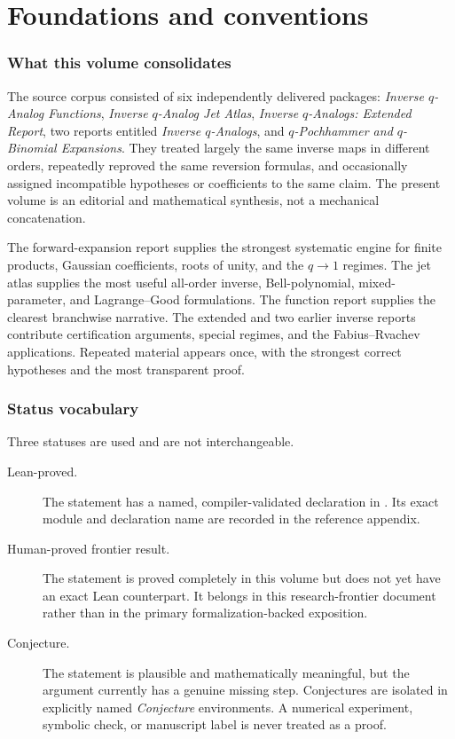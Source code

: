 \part{Foundations and conventions}

\section{What this volume consolidates}
\label{sec:scope}

The source corpus consisted of six independently delivered packages:
\emph{Inverse \(q\)-Analog Functions},
\emph{Inverse \(q\)-Analog Jet Atlas},
\emph{Inverse \(q\)-Analogs: Extended Report},
two reports entitled \emph{Inverse \(q\)-Analogs}, and
\emph{\(q\)-Pochhammer and \(q\)-Binomial Expansions}.  They treated largely
the same inverse maps in different orders, repeatedly reproved the same
reversion formulas, and occasionally assigned incompatible hypotheses or
coefficients to the same claim.  The present volume is an editorial and
mathematical synthesis, not a mechanical concatenation.

The forward-expansion report supplies the strongest systematic engine for
finite products, Gaussian coefficients, roots of unity, and the
\(q\to1\) regimes.  The jet atlas supplies the most useful all-order inverse,
Bell-polynomial, mixed-parameter, and Lagrange--Good formulations.  The
function report supplies the clearest branchwise narrative.  The extended and
two earlier inverse reports contribute certification arguments, special
regimes, and the Fabius--Rvachev applications.  Repeated material appears once,
with the strongest correct hypotheses and the most transparent proof.

\section{Status vocabulary}
\label{sec:status-vocabulary}

Three statuses are used and are not interchangeable.

\begin{description}
\item[Lean-proved.]
The statement has a named, compiler-validated declaration in
\repo.  Its exact module and declaration name are recorded in the reference
appendix.
\item[Human-proved frontier result.]
The statement is proved completely in this volume but does not yet have an
exact Lean counterpart.  It belongs in this research-frontier document rather
than in the primary formalization-backed exposition.
\item[Conjecture.]
The statement is plausible and mathematically meaningful, but the argument
currently has a genuine missing step.  Conjectures are isolated in explicitly
named \emph{Conjecture} environments.  A numerical experiment, symbolic check,
or manuscript label is never treated as a proof.
\end{description}

